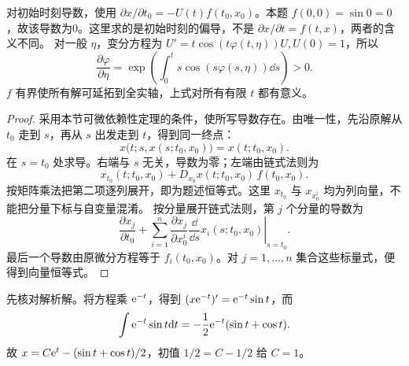 对初始时刻导数，使用 $\partial x/\partial t_0=-U(t)f(t_0,x_0)$。本题 $f(0,0)=\sin0=0$，故该导数为0。这里求的是初始时刻的偏导，不是 $\partial x/\partial t=f(t,x)$，两者的含义不同。
对一般 $\eta$，变分方程为 $U'=t\cos(t\varphi(t,\eta))U,U(0)=1$，所以
\[
 \dfrac{\partial\varphi}{\partial\eta}
 =\exp\left(\int_0^t s\cos(s\varphi(s,\eta))\dd s\right)>0.
\]
$f$ 有界使所有解可延拓到全实轴，上式对所有有限 $t$ 都有意义。
\begin{proof}
采用本节可微依赖性定理的条件，使所写导数存在。由唯一性，先沿原解从 $t_0$ 走到 $s$，再从 $s$ 出发走到 $t$，得到同一终点：
\[
 x\bigl(t;s,x(s;t_0,x_0)\bigr)=x(t;t_0,x_0).
\]
在 $s=t_0$ 处求导。右端与 $s$ 无关，导数为零；左端由链式法则为
\[
 x_{t_0}(t;t_0,x_0)+D_{x_0}x(t;t_0,x_0)\,f(t_0,x_0).
\]
按矩阵乘法把第二项逐列展开，即为题述恒等式。这里 $x_{t_0}$ 与 $x_{x_0^i}$ 均为列向量，不能把分量下标与自变量混淆。
按分量展开链式法则，第 $j$ 个分量的导数为
\[
\dfrac{\partial x_j}{\partial t_0}
+\sum_{i=1}^n\dfrac{\partial x_j}{\partial x_0^i}
\left.\dfrac\dd{\dd s}x_i(s;t_0,x_0)\right|_{s=t_0}.
\]
最后一个导数由原微分方程等于 $f_i(t_0,x_0)$。对 $j=1,\ldots,n$ 集合这些标量式，便得到向量恒等式。
\end{proof}
先核对解析解。将方程乘 $\mathrm e^{-t}$，得到 $(x\mathrm e^{-t})'=\mathrm e^{-t}\sin t$，而
\[
\int\mathrm e^{-t}\sin t\mathrm d t=-\dfrac12\mathrm e^{-t}(\sin t+\cos t).
\]
故 $x=C\mathrm e^t-(\sin t+\cos t)/2$，初值 $1/2=C-1/2$ 给 $C=1$。

